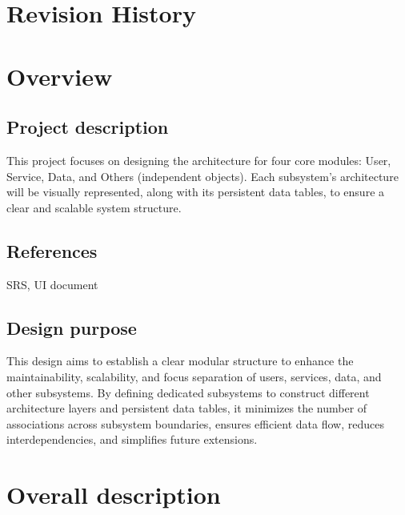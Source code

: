 
\newcommand{\myversion}{1.0}   %





\tableofcontents

\chapter*{Revision History}



\chapter{Overview}
\section{Project description}
This project focuses on designing the architecture for four core modules: User, Service, Data, and Others (independent objects). Each subsystem's architecture will be visually represented, along with its persistent data tables, to ensure a clear and scalable system structure.

\section{References}
SRS, UI document

\section{Design purpose}
This design aims to establish a clear modular structure to enhance the maintainability, scalability, and focus separation of users, services, data, and other subsystems. By defining dedicated subsystems to construct different architecture layers and persistent data tables, it minimizes the number of associations across subsystem boundaries, ensures efficient data flow, reduces interdependencies, and simplifies future extensions.


\chapter{Overall description}
